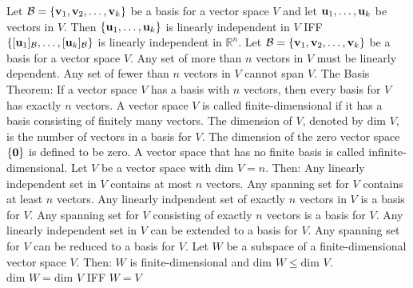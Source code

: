 \documentclass{article}
\begin{document}
\begin{outline}
            \1 Let \(\mathcal B=\{\vb v_1,\vb v_2,\ldots,\vb v_k\}\) be a basis for a vector space $V$ and let \(\vb u_1,\ldots,\vb u_k\) be vectors in $V$. Then \(\{\vb u_1,\ldots,\vb u_k\}\) is linearly independent in $V$ IFF \(\{[\vb u_1]_\mathcal B,\ldots,[\vb u_k]_\mathcal B\}\) is linearly independent in \(\mathbb R^n\). 
            \1 Let \(\mathcal B=\{\vb v_1,\vb v_2,\ldots,\vb v_k\}\) be a basis for a vector space $V$. 
                \2 Any set of more than $n$ vectors in $V$ must be linearly dependent. 
                \2 Any set of fewer than $n$ vectors in $V$ cannot span $V$. 
            \1 The Basis Theorem: If a vector space $V$ has a basis with $n$ vectors, then every basis for $V$ has exactly $n$ vectors. 
            \1 A vector space $V$ is called finite-dimensional if it has a basis consisting of finitely many vectors. The dimension of $V$, denoted by \(\text{dim }V\), is the number of vectors in a basis for $V$. The dimension of the zero vector space \(\{\vb 0\}\) is defined to be zero. A vector space that has no finite basis is called infinite-dimensional. 
            \1 Let $V$ be a vector space with \(\text{dim }V=n\). Then: 
                \2 Any linearly independent set in $V$ contains at most $n$ vectors. 
                \2 Any spanning set for $V$ contains at least $n$ vectors. 
                \2 Any linearly indpendent set of exactly $n$ vectors in $V$ is a basis for $V$. 
                \2 Any spanning set for $V$ consisting of exactly $n$ vectors is a basis for $V$. 
                \2 Any linearly independent set in $V$ can be extended to a basis for $V$. 
                \2 Any spanning set for $V$ can be reduced to a basis for $V$. 
            \1 Let $W$ be a subspace of a finite-dimensional vector space $V$. Then: 
                \2 $W$ is finite-dimensional and \(\text{dim }W\leq\text{dim }V\). 
                \2 \(\text{dim }W=\text{dim }V\) IFF \(W=V\)
        \end{outline}
\end{document}
